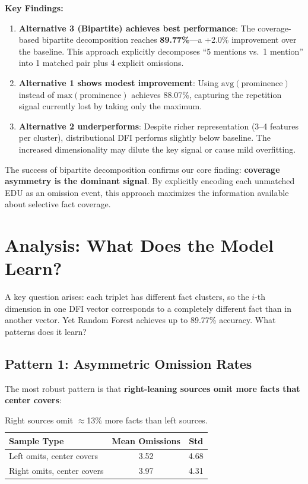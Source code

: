 \documentclass[11pt]{article}
\begin{document}
\textbf{Key Findings:}

\begin{enumerate}
    \item \textbf{Alternative 3 (Bipartite) achieves best performance}: The coverage-based bipartite decomposition reaches \textbf{89.77\%}---a +2.0\% improvement over the baseline. This approach explicitly decomposes ``5 mentions vs.\ 1 mention'' into 1 matched pair plus 4 explicit omissions.
    
    \item \textbf{Alternative 1 shows modest improvement}: Using $\text{avg}(\text{prominence})$ instead of $\text{max}(\text{prominence})$ achieves 88.07\%, capturing the repetition signal currently lost by taking only the maximum.
    
    \item \textbf{Alternative 2 underperforms}: Despite richer representation (3--4 features per cluster), distributional DFI performs slightly below baseline. The increased dimensionality may dilute the key signal or cause mild overfitting.
\end{enumerate}

The success of bipartite decomposition confirms our core finding: \textbf{coverage asymmetry is the dominant signal}. By explicitly encoding each unmatched EDU as an omission event, this approach maximizes the information available about selective fact coverage.


\section{Analysis: What Does the Model Learn?}

A key question arises: each triplet has different fact clusters, so the $i$-th dimension in one DFI vector corresponds to a completely different fact than in another vector. Yet Random Forest achieves up to 89.77\% accuracy. What patterns does it learn?

\subsection{Pattern 1: Asymmetric Omission Rates}

The most robust pattern is that \textbf{right-leaning sources omit more facts that center covers}:

\begin{table}[h]
\centering
\small
\begin{tabular}{lcc}
\toprule
\textbf{Sample Type} & \textbf{Mean Omissions} & \textbf{Std} \\
\midrule
Left omits, center covers & 3.52 & 4.68 \\
Right omits, center covers & 3.97 & 4.31 \\
\bottomrule
\end{tabular}
\caption{Right sources omit $\approx$13\% more facts than left sources.}
\label{tab:omission}
\end{table}
\end{document}
